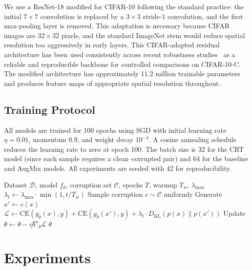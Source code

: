 \documentclass[10pt,twocolumn]{article}
\begin{document}
We use a ResNet-18 modified for CIFAR-10 following the standard practice: the initial $7 \times 7$ convolution is replaced by a $3 \times 3$ stride-1 convolution, and the first max-pooling layer is removed. This adaptation is necessary because CIFAR images are $32 \times 32$ pixels, and the standard ImageNet stem would reduce spatial resolution too aggressively in early layers. This CIFAR-adapted residual architecture has been used consistently across recent robustness studies~\cite{ranabhat2025shapebias,kumar2026demhec} as a reliable and reproducible backbone for controlled comparisons on CIFAR-10-C. The modified architecture has approximately 11.2 million trainable parameters and produces feature maps of appropriate spatial resolution throughout.

\subsection{Training Protocol}

All models are trained for 100 epochs using SGD with initial learning rate $\eta=0.01$, momentum $0.9$, and weight decay $10^{-4}$. A cosine annealing schedule reduces the learning rate to zero at epoch 100. The batch size is 32 for the CRT model (since each sample requires a clean--corrupted pair) and 64 for the baseline and AugMix models. All experiments are seeded with 42 for reproducibility.

\begin{algorithm}[t]
\caption{Consistency-Regularised Training (CRT)}
\label{alg:crt}
\begin{algorithmic}[1]
\REQUIRE Dataset $\mathcal{D}$, model $f_\theta$, corruption set $\mathcal{C}$, epochs $T$, warmup $T_w$, $\lambda_{\max}$
  \STATE $\lambda_t \leftarrow \lambda_{\max} \cdot \min(1, t / T_w)$
    \STATE Sample corruption $c \sim \mathcal{C}$ uniformly
    \STATE Generate $x' \leftarrow c(x)$
    \STATE $\mathcal{L} \leftarrow \mathrm{CE}(g_\theta(x), y) + \mathrm{CE}(g_\theta(x'), y) + \lambda_t \cdot D_{\mathrm{KL}}(p(x) \| p(x'))$
    \STATE Update $\theta \leftarrow \theta - \eta \nabla_\theta \mathcal{L}$
  \ENDFOR
\ENDFOR
\RETURN $\theta$
\end{algorithmic}
\end{algorithm}

\section{Experiments}
\end{document}
